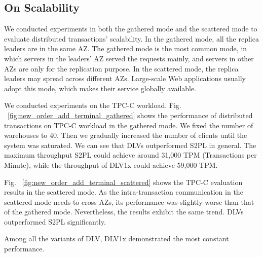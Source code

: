 \documentclass[conference]{IEEEtran}
\begin{document}
\subsection{On Scalability}

We conducted experiments in both the gathered mode and the scattered mode to evaluate distributed transactions' scalability.
In the gathered mode, all the replica leaders are in the same AZ.
The gathered mode is the most common mode, in which servers in the leaders' AZ served the requests mainly, and servers in other AZs are only for the replication purpose.
In the scattered mode, the replica leaders may spread across different AZs.
Large-scale Web applications usually adopt this mode, which makes their service globally available.

We conducted experiments on the TPC-C workload.
Fig. ~\ref{fig:new_order_add_terminal_gathered} shows the performance of distributed transactions on TPC-C workload in the gathered mode.
We fixed the number of warehouses to 40.
Then we gradually increased the number of clients until the system was saturated.
We can see that DLVs outperformed S2PL in general.
The maximum throughput S2PL could achieve around 31,000 TPM (Transactions per Minute),
while the throughput of DLV1x could achieve 59,000 TPM.


Fig. ~\ref{fig:new_order_add_terminal_scattered}  shows the TPC-C evaluation results in the scattered mode.
As the intra-transaction communication in the scattered mode needs to cross AZs, its performance was slightly worse than that of the gathered mode.
Nevertheless, the results exhibit the same trend. DLVs outperformed S2PL significantly.

Among all the variants of DLV, DLV1x demonstrated the most constant performance.

\end{document}
